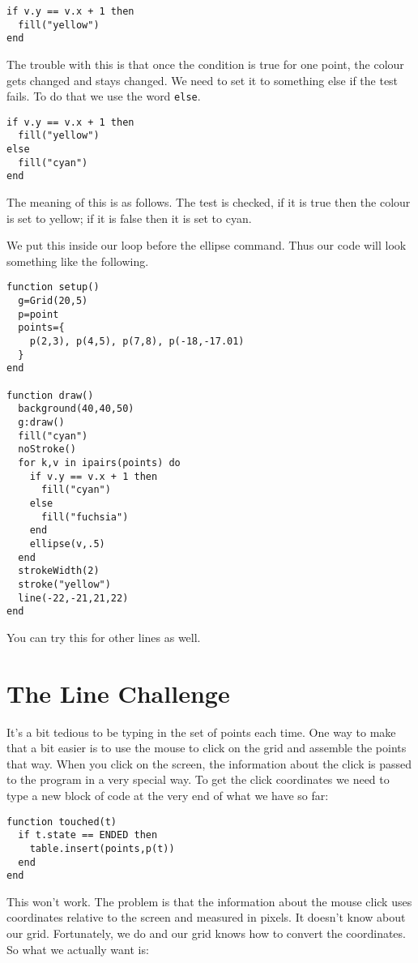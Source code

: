 \documentclass[
  xhtml,%
  use filename%
]{internet}
\begin{document}
\begin{verbatim}
if v.y == v.x + 1 then
  fill("yellow")
end
\end{verbatim}

The trouble with this is that once the condition is true for one point, the colour gets changed and stays changed.
We need to set it to something else if the test fails.
To do that we use the word \verb+else+.

\begin{verbatim}
if v.y == v.x + 1 then
  fill("yellow")
else
  fill("cyan")
end
\end{verbatim}

The meaning of this is as follows.
The test is checked, if it is true then the colour is set to yellow; if it is false then it is set to cyan.

We put this inside our loop before the ellipse command.
Thus our code will look something like the following.

\begin{verbatim}
function setup()
  g=Grid(20,5)
  p=point
  points={
    p(2,3), p(4,5), p(7,8), p(-18,-17.01)
  }
end

function draw()
  background(40,40,50)
  g:draw()
  fill("cyan")
  noStroke()
  for k,v in ipairs(points) do
    if v.y == v.x + 1 then
      fill("cyan")
    else
      fill("fuchsia")
    end
    ellipse(v,.5)
  end
  strokeWidth(2)
  stroke("yellow")
  line(-22,-21,21,22)
end
\end{verbatim}

You can try this for other lines as well.

\section{The Line Challenge}

It's a bit tedious to be typing in the set of points each time.
One way to make that a bit easier is to use the mouse to click on the grid and assemble the points that way.
When you click on the screen, the information about the click is passed to the program in a very special way.
To get the click coordinates we need to type a new block of code at the very end of what we have so far:

\begin{verbatim}
function touched(t)
  if t.state == ENDED then
    table.insert(points,p(t))
  end
end
\end{verbatim}

This won't work.
The problem is that the information about the mouse click uses coordinates relative to the screen and measured in pixels.
It doesn't know about our grid.
Fortunately, we do and our grid knows how to convert the coordinates.
So what we actually want is:
\end{document}
